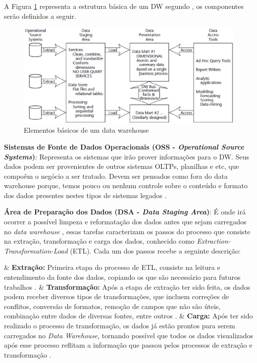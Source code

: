 A Figura \ref{fig:elem-bas-dw} representa a estrutura básica de um DW segundo , os componentes serão definidos a seguir.

\begin{figure}[h!]
\centering
\includegraphics[keepaspectratio=false,scale=0.67]{figuras/figuras_pedro/elem-bas-dw.eps}
\caption{Elementos básicos de um data warehouse}
\label{fig:elem-bas-dw}
\end{figure}
\FloatBarrier

\textbf{Sistemas de Fonte de Dados Operacionais (OSS - \textit{Operational Source Systems})}:
Representa os sistemas que irão prover informações para o DW. Seus dados podem ser provenientes de outros sistemas OLTPs, planilhas e etc, que compoêm o negócio a ser tratado. Devem ser pensados como fora do data warehouse porque, temos pouco ou nenhum controle sobre o conteúdo e formato dos dados presentes nestes tipos de sistemas legados \cite{Kimball2002}.

\textbf{Área de Preparação dos Dados (DSA - \textit{Data Staging Area})}:
É onde irá ocorrer a possível limpeza e reformatação dos dados antes que sejam carregados no \textit{data warehouse} \cite{elmasri_sistemas_2011}, essas tarefas caracterizam os passos do processo que consiste na extração, transformação e carga dos dados, conhecido como \textit{Extraction-Transformation-Load} (ETL). Cada um dos passos recebe a seguinte descrição:

\begin{easylist}[itemize]

	& \textbf{Extração: } Primeira etapa do processo de ETL, consiste na leitura e entendimento da fonte 		dos dados, copiando os que são necessário para futuros trabalhos \cite{Kimball2002}.  
	& \textbf{Transformação: } Após a etapa de extração ter sido feita, os dados podem receber diversos tipos de transformações, que incluem correções de conflitos, conversão de formatos, remoção de campos que não são úteis, combinação entre dados de diversas fontes, entre outros \cite{Kimball2002}.
	& \textbf{Carga: } Após ter sido realizado o processo de transformação, os dados já estão prontos para serem carregados no \textit{Data Warehouse}, tornando possível que todos os dados visualizados após esse processo reflitam a informação que passou pelos processos de extração e transformação \cite{neeraj_sharma_2011}.  

	\end{easylist}


